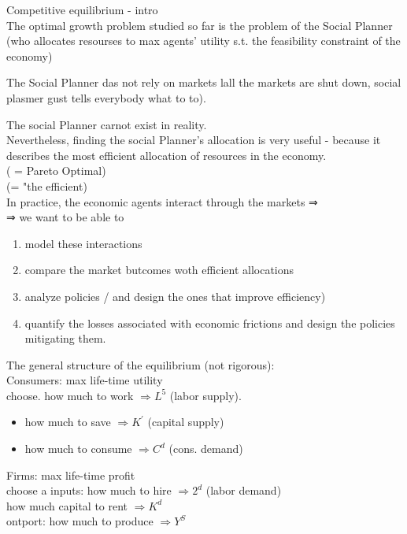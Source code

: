 \documentclass[10pt]{article}
\begin{document}
Competitive equilibrium - intro\\
The optimal growth problem studied so far is the problem of the Social Planner\\
(who allocates resourses to max agents' utility s.t. the feasibility constraint of the economy)

The Social Planner das not rely on markets lall the markets are shut down, social plasmer gust tells everybody what to to).

The social Planner carnot exist in reality.\\
Nevertheless, finding the social Planner's allocation is very useful - because it describes the most efficient allocation of resources in the economy.\\
( = Pareto Optimal)\\
(= "the efficient)\\
In practice, the economic agents interact through the markets ⇒\\
⇒ we want to be able to

\begin{enumerate}
  \item model these interactions
  \item compare the market butcomes woth efficient allocations
  \item analyze policies / and design the ones that improve efficiency)
  \item quantify the losses associated with economic frictions and design the policies mitigating them.
\end{enumerate}

The general structure of the equilibrium (not rigorous):\\
Consumers: max life-time utility\\
choose. how much to work $\Rightarrow L^{5}$ (labor supply).

\begin{itemize}
  \item how much to save $\Rightarrow K^{\prime}$ (capital supply)
  \item how much to consume $\Rightarrow C^{d}$ (cons. demand)
\end{itemize}

Firms: max life-time profit\\
choose a inputs: how much to hire $\Rightarrow 2^{d}$ (labor demand)\\
how much capital to rent $\Rightarrow K^{d}$\\
ontport: how much to produce $\Rightarrow Y^{S}$
\end{document}
